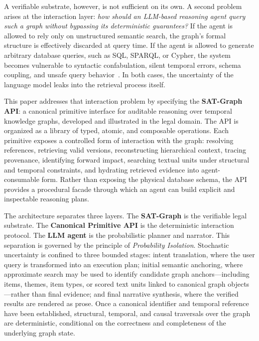\documentclass[11pt]{article}
\begin{document}
A verifiable substrate, however, is not sufficient on its own. A second problem arises at the interaction layer: \textit{how should an LLM-based reasoning agent query such a graph without bypassing its deterministic guarantees?} If the agent is allowed to rely only on unstructured semantic search, the graph's formal structure is effectively discarded at query time. If the agent is allowed to generate arbitrary database queries, such as SQL, SPARQL, or Cypher, the system becomes vulnerable to syntactic confabulation, silent temporal errors, schema coupling, and unsafe query behavior~\cite{scholak2021picard}. In both cases, the uncertainty of the language model leaks into the retrieval process itself.

This paper addresses that interaction problem by specifying the \textbf{SAT-Graph API}: a canonical primitive interface for auditable reasoning over temporal knowledge graphs, developed and illustrated in the legal domain. The API is organized as a library of typed, atomic, and composable operations. Each primitive exposes a controlled form of interaction with the graph: resolving references, retrieving valid versions, reconstructing hierarchical context, tracing provenance, identifying forward impact, searching textual units under structural and temporal constraints, and hydrating retrieved evidence into agent-consumable form. Rather than exposing the physical database schema, the API provides a procedural facade through which an agent can build explicit and inspectable reasoning plans.

The architecture separates three layers. The \textbf{SAT-Graph} is the verifiable legal substrate. The \textbf{Canonical Primitive API} is the deterministic interaction protocol. The \textbf{LLM agent} is the probabilistic planner and narrator. This separation is governed by the principle of \textit{Probability Isolation}. Stochastic uncertainty is confined to three bounded stages: intent translation, where the user query is transformed into an execution plan; initial semantic anchoring, where approximate search may be used to identify candidate graph anchors---including items, themes, item types, or scored text units linked to canonical graph objects---rather than final evidence; and final narrative synthesis, where the verified results are rendered as prose. Once a canonical identifier and temporal reference have been established, structural, temporal, and causal traversals over the graph are deterministic, conditional on the correctness and completeness of the underlying graph state.
\end{document}
